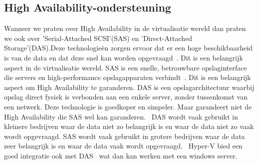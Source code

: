 \subsection{High Availability-ondersteuning}
Wanneer we praten over High Availability in de virtualisatie wereld dan praten we ook over 'Serial-Attached SCSI'(SAS) en 'Direct-Attached Storage'\newline(DAS).Deze technologieën zorgen ervoor dat er een hoge beschikbaarheid is van de data en dat deze snel kan worden opgevraagd~\autocite{griswold2002storage}. Dit is een belangrijk aspect in de virtualisatie wereld.
SAS is een snelle, betrouwbare opslaginterface die servers en high-performance opslagapparaten verbindt~\autocite{aravindan2014performance}. Dit is een belangrijk aspect om High Availability te garanderen. DAS is een opslagarchitectuur waarbij opslag direct fysiek is verbonden aan een enkele server, zonder tussenkomst van een netwerk. Deze technologie is goedkoper en simpeler. Maar garandeert niet de High Availability die SAS wel kan garanderen.~\autocite{griswold2002storage}
DAS wordt vaak gebruikt in kleinere bedrijven waar de data niet zo belangrijk is en waar de data niet zo vaak wordt opgevraagd. SAS wordt vaak gebruikt in grotere bedrijven waar de data zeer belangrijk is en waar de data vaak wordt opgevraagd.~\autocite{griswold2002storage}
Hyper-V bied een goed integratie ook met DAS~\autocite{microsoft_hyperv_storage} wat dan kan werken met een windows server.


